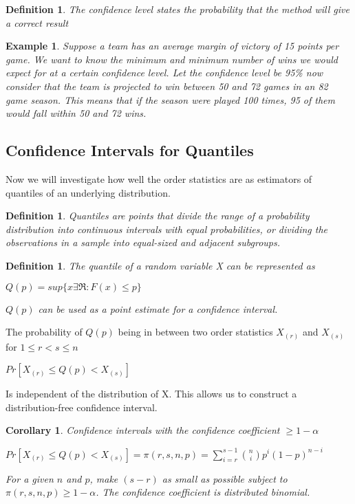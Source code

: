 \documentclass[11pt,a4paper]{article}
\theoremstyle{plain}
\newtheorem{cor}[fact]{Corollary}
\newtheorem{de}[fact]{Definition}
\newtheorem{exmp}[fact]{Example}
\begin{document}
\begin{de}
The confidence level states the probability that the method will give a correct result
\end{de}

\begin{exmp} 
Suppose a team has an average margin of victory of 15 points per game. We want to know the minimum and minimum number of wins we would expect for at a certain confidence level.  Let the confidence level be 95\% now consider that the team is projected to win between 50 and 72 games in an 82 game season. This means that if the season were played 100 times, 95 of them would fall within 50 and 72 wins.
\end{exmp}

\subsection*{Confidence Intervals for Quantiles}

Now we will investigate how well the order statistics are as estimators of quantiles of an underlying distribution. 

\begin{de}
Quantiles are points that divide the range of a probability distribution into continuous intervals with equal probabilities, or dividing the observations in a sample into equal-sized and adjacent subgroups.
\end{de}
\begin{de}
The quantile of a random variable X can be represented as 
\begin{center}
$Q(p)=sup\{x\exists \Re: F(x) \leq p\}$
\end{center}
$Q(p)$ can be used as a point estimate for a confidence interval. 
\end{de}

The probability of $Q(p)$ being in between two order statistics $X_{(r)}$ and $X_{(s)}$ for $1 \leq r < s \leq n$
\begin{center}
$Pr[X_{(r)}\leq Q(p) < X_{(s)}]$
\end{center}
Is independent of the distribution of X. This allows us to construct a distribution-free confidence interval.
\begin{cor}
Confidence intervals with the confidence coefficient $\geq 1-\alpha$
\begin{center}
$Pr[X_{(r)}\leq Q(p) < X_{(s)}]=\pi(r,s,n,p)=\sum_{i=r}^{s-1}\binom{n}{i}p^i(1-p)^{n-i}$
\end{center}
For a given $n$ and $p$, make $(s-r)$ as small as possible subject to $\pi(r,s,n,p)\geq 1-\alpha$. The confidence coefficient is distributed binomial. 
\end{cor}
\end{document}
